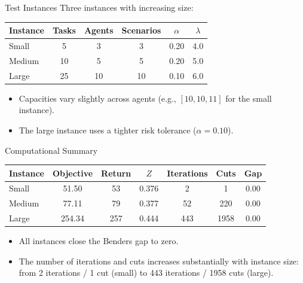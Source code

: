 \documentclass[aspectratio=169,11pt]{beamer}
\begin{document}
\begin{frame}{Test Instances}
	Three instances with increasing size:
	\vspace{0.2cm}
	\begin{center}
	\begin{tabular}{lccccc}
		\toprule
		Instance & Tasks & Agents & Scenarios & $\alpha$ & $\lambda$ \\
		\midrule
		Small  & 5  & 3  & 3  & 0.20 & 4.0 \\
		Medium & 10 & 5  & 5  & 0.20 & 5.0 \\
		Large  & 25 & 10 & 10 & 0.10 & 6.0 \\
		\bottomrule
	\end{tabular}
	\end{center}
	\pause
	\vspace{0.2cm}
	\begin{itemize}
		\item Capacities vary slightly across agents
			(e.g., $[10, 10, 11]$ for the small instance).
		\item The large instance uses a tighter risk tolerance ($\alpha = 0.10$).
	\end{itemize}
\end{frame}

\begin{frame}{Computational Summary}
	\begin{center}
	\begin{tabular}{lcccccc}
		\toprule
		Instance & Objective & Return & $Z$ & Iterations & Cuts & Gap \\
		\midrule
		Small  & 51.50  & 53  & 0.376 & 2   & 1    & 0.00 \\
		Medium & 77.11  & 79  & 0.377 & 52  & 220  & 0.00 \\
		Large  & 254.34 & 257 & 0.444 & 443 & 1958 & 0.00 \\
		\bottomrule
	\end{tabular}
	\end{center}
	\pause
	\vspace{0.2cm}
	\begin{itemize}
		\item All instances close the Benders gap to zero.
		\item The number of iterations and cuts increases substantially with
			instance size: from 2 iterations / 1 cut (small) to
			443 iterations / 1958 cuts (large).
	\end{itemize}
\end{frame}
\end{document}
